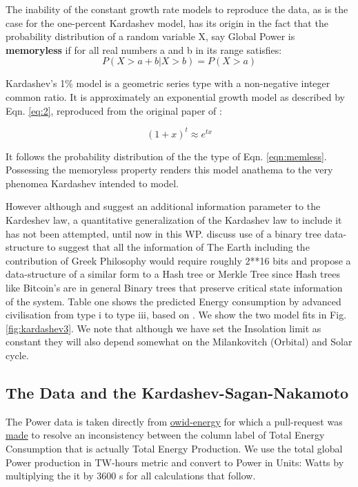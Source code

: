 \documentclass[final,5p,times,twocolumn,authoryear]{elsarticle}
\begin{document}
The inability of the constant growth rate models to reproduce the data, as is the case for the one-percent Kardashev model, has its origin in the fact that the probability distribution of a random variable X, say Global Power is \textbf{memoryless} if for all real numbers a and b in its range satisfies:
\begin{equation}
P(X>a +b|X>b)=P(X>a)
\label{eqn:memless}
\end{equation}

Kardashev's 1\% model is a geometric series type with a non-negative integer common ratio. It is approximately an exponential growth model as described by Eqn. \ref{eq:2}, reproduced from the original paper of \cite{kar64}:

\begin{equation}
(1+x)^t \approx e^{tx}
\label{eq:2}
\end{equation}

It follows the probability distribution of the the type of Eqn. \ref{eqn:memless}. Possessing the memoryless property renders this model anathema to the very phenomea Kardashev intended to model.

 However although \cite{sagan73} and \cite{kar64} suggest an additional information parameter to the Kardeshev law, a quantitative generalization of the Kardashev law to include it has not been attempted, until now in this WP.  \cite{sagan73} discuss use of a binary tree data-structure to suggest that all the information of The Earth including the contribution of Greek Philosophy would require roughly 2**16 bits and propose a data-structure of a similar form to a Hash tree or Merkle Tree since Hash trees like Bitcoin's are in general Binary trees that preserve critical state information of the system. Table one shows the predicted Energy consumption by advanced civilisation from type i to type iii, based on \cite{kar64}. We show the two model fits in Fig. \ref{fig:kardashev3}. We note that although we have set the Insolation limit as constant they will also depend somewhat on the Milankovitch (Orbital) and Solar cycle. 

\subsection{The Data and the Kardashev-Sagan-Nakamoto}
\label{subsec: data}

The Power data is taken directly from \href{https://github.com/owid/energy-data}{owid-energy} for which a pull-request was \href{https://github.com/owid/energy-data/pull/23}{made} to resolve an inconsistency between the column label of Total Energy Consumption that is actually Total Energy Production. We use the total global Power production in TW-hours metric and convert to Power in Units: Watts by multiplying the it by 3600 s for all calculations that follow.
\end{document}
